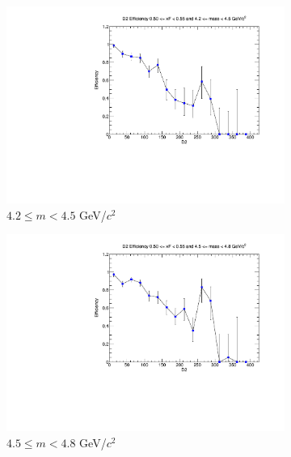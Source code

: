 \documentclass[11pt]{article}
\begin{document}
\begin{figure}[p]
    \centering
    \begin{subfigure}[b]{0.32\textwidth}
        \centering
        \includegraphics[width=\textwidth]{./kTrackerEfficiencyPlots/D2_Efficiency_xF10_mass0.pdf}
        \caption{$4.2 \leq m < 4.5$ GeV/$c^2$}
    \end{subfigure}\hfill
    \begin{subfigure}[b]{0.32\textwidth}
        \centering
        \includegraphics[width=\textwidth]{./kTrackerEfficiencyPlots/D2_Efficiency_xF10_mass1.pdf}
        \caption{$4.5 \leq m < 4.8$ GeV/$c^2$}
    \end{subfigure}\hfill
    \begin{subfigure}[b]{0.32\textwidth}
        \centering

\end{subfigure}
\end{figure}
\end{document}

